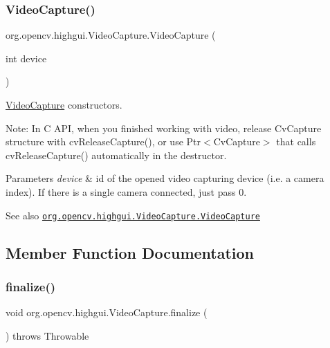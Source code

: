 \subsubsection{\texorpdfstring{Video\+Capture()}{VideoCapture()}\hspace{0.1cm}{\footnotesize\ttfamily [3/3]}}
{\footnotesize\ttfamily org.\+opencv.\+highgui.\+Video\+Capture.\+Video\+Capture (\begin{DoxyParamCaption}\item[{int}]{device }\end{DoxyParamCaption})}

\mbox{\hyperlink{classorg_1_1opencv_1_1highgui_1_1_video_capture}{Video\+Capture}} constructors.

Note\+: In C A\+PI, when you finished working with video, release {\ttfamily Cv\+Capture} structure with {\ttfamily cv\+Release\+Capture()}, or use {\ttfamily Ptr$<$\+Cv\+Capture$>$} that calls {\ttfamily cv\+Release\+Capture()} automatically in the destructor.


\begin{DoxyParams}{Parameters}
{\em device} & id of the opened video capturing device (i.\+e. a camera index). If there is a single camera connected, just pass 0.\\
\hline
\end{DoxyParams}
\begin{DoxySeeAlso}{See also}
\href{http://docs.opencv.org/modules/highgui/doc/reading_and_writing_images_and_video.html#videocapture-videocapture}{\tt org.\+opencv.\+highgui.\+Video\+Capture.\+Video\+Capture} 
\end{DoxySeeAlso}


\subsection{Member Function Documentation}
\mbox{\label{classorg_1_1opencv_1_1highgui_1_1_video_capture_a13e45dabaaaabe98c0eb1138e2846f03}} 
\subsubsection{\texorpdfstring{finalize()}{finalize()}}
{\footnotesize\ttfamily void org.\+opencv.\+highgui.\+Video\+Capture.\+finalize (\begin{DoxyParamCaption}{ }\end{DoxyParamCaption}) throws Throwable\hspace{0.3cm}{\ttfamily [protected]}}

